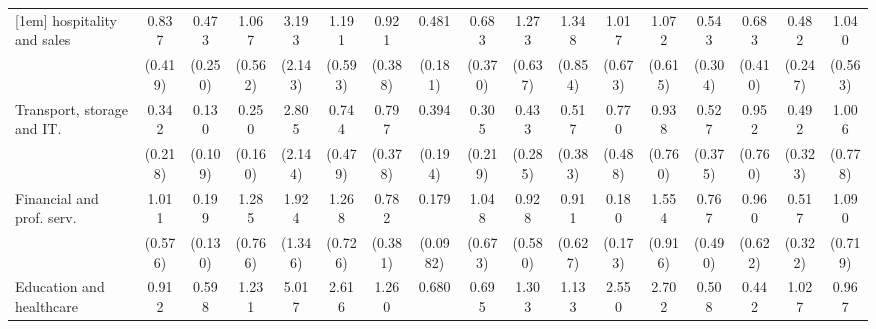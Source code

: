 {\begin{tabular}{l*{16}{c}}
[1em]
hospitality and sales&       0.837         &       0.473         &       1.067         &       3.193         &       1.191         &       0.921         &       0.481         &       0.683         &       1.273         &       1.348         &       1.017         &       1.072         &       0.543         &       0.683         &       0.482         &       1.040         \\
                    &     (0.419)         &     (0.250)         &     (0.562)         &     (2.143)         &     (0.593)         &     (0.388)         &     (0.181)         &     (0.370)         &     (0.637)         &     (0.854)         &     (0.673)         &     (0.615)         &     (0.304)         &     (0.410)         &     (0.247)         &     (0.563)         \\
[1em]
Transport, storage and IT.&       0.342         &       0.130\sym{*}  &       0.250\sym{*}  &       2.805         &       0.744         &       0.797         &       0.394         &       0.305         &       0.433         &       0.517         &       0.770         &       0.938         &       0.527         &       0.952         &       0.492         &       1.006         \\
                    &     (0.218)         &     (0.109)         &     (0.160)         &     (2.144)         &     (0.479)         &     (0.378)         &     (0.194)         &     (0.219)         &     (0.285)         &     (0.383)         &     (0.488)         &     (0.760)         &     (0.375)         &     (0.760)         &     (0.323)         &     (0.778)         \\
[1em]
Financial and prof. serv.&       1.011         &       0.199\sym{*}  &       1.285         &       1.924         &       1.268         &       0.782         &       0.179\sym{**} &       1.048         &       0.928         &       0.911         &       0.180         &       1.554         &       0.767         &       0.960         &       0.517         &       1.090         \\
                    &     (0.576)         &     (0.130)         &     (0.766)         &     (1.346)         &     (0.726)         &     (0.381)         &    (0.0982)         &     (0.673)         &     (0.580)         &     (0.627)         &     (0.173)         &     (0.916)         &     (0.490)         &     (0.622)         &     (0.322)         &     (0.719)         \\
[1em]
Education and healthcare&       0.912         &       0.598         &       1.231         &       5.017\sym{*}  &       2.616         &       1.260         &       0.680         &       0.695         &       1.303         &       1.133         &       2.550         &       2.702         &       0.508         &       0.442         &       1.027         &       0.967         \\

\end{tabular}}
